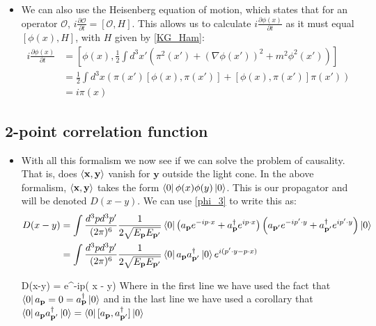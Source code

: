 \documentclass[11pt]{article}
\renewenvironment{flalign}{\vspace{-3mm}\empheq[box=\tcbhighmath]{align}}{\endempheq}
\numberwithin{equation}{section}
\begin{document}
\begin{itemize}
  \item We can also use the Heisenberg equation of motion, which states that for an operator $\mathcal{O}$, $i\frac{\partial \mathcal{O}}{\partial t} = [\mathcal{O},H]$. This allows us to calculate $i\frac{\partial \phi(x)}{\partial t}$ as it must equal $[\phi(x),H]$, with $H$ given by \ref{KG_Ham}:
  \begin{equation*}
  \begin{split}
    i\frac{\partial \phi(x)}{\partial t} & = [\phi(x),\frac{1}{2}\int d^3x'\left(\pi^2(x') +(\nabla\phi(x'))^2+m^2\phi^2(x')\right) ] \\
      & =  \frac{1}{2}\int d^3x \left(\pi(x')[\phi(x), \pi(x')]+[\phi(x), \pi(x')]\pi(x') \right) \\
      & = i \pi(x)
  \end{split}
  \end{equation*}

\end{itemize}
\subsection{2-point correlation function}
\begin{itemize}
  \item  With all this formalism we now see if we can solve the problem of causality. That is, does $\braket{\textbf{x},\textbf{y}}$ vanish for $\textbf{y}$ outside the light cone. In the above formalism, $\braket{\textbf{x},\textbf{y}}$ takes the form $\bra{0}\phi(x)\phi(y)\ket{0}$. This is our propagator and will be denoted $D(x-y)$. We can use \ref{phi_3} to write this as:
  \begin{align*}
   D(x-y) & = \int \frac{d^3pd^3p'}{(2\pi)^6}\frac{1}{2\sqrt{E_{\textbf{p}}E_{\textbf{p}'}}}\bra{0}\left(a_{\textbf{p}}e^{-ip \cdot x}+a^{\dagger}_{\textbf{p}}e^{ip \cdot x}\right)\left(a_{\textbf{p}'}e^{-ip'\cdot y}+a^{\dagger}_{\textbf{p}'}e^{ip' \cdot y}\right)\ket{0}    \\
  & = \int \frac{d^3pd^3p'}{(2\pi)^6}\frac{1}{2\sqrt{E_{\textbf{p}}E_{\textbf{p}'}}}\bra{0}a_{\textbf{p}}a^{\dagger}_{\textbf{p}'}\ket{0}e^{i(p' \cdot y - p \cdot x) } 
  \end{align*}

  \begin{flalign}
  \label{D(x-y)}
  \implies D(x-y) = \int {}e^{-ip\cdot( x - y) }
  \end{flalign}
  Where in the first line we have used the fact that $\bra{0}a_{\textbf{p}} = 0 = a^{\dagger}_{\textbf{p}}\ket{0}$ and in the last line we have used a corollary that $\bra{0}a_{\textbf{p}}a^{\dagger}_{\textbf{p}'}\ket{0}  =\bra{0}[a_{\textbf{p}},a^{\dagger}_{\textbf{p}'}]\ket{0}$
\end{itemize}
\end{document}
